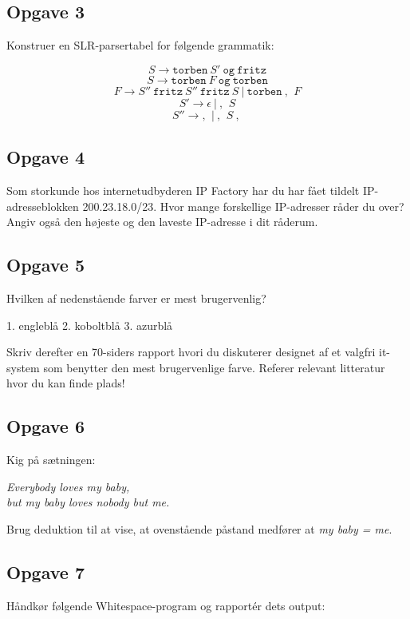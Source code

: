 \subsection{Opgave 3}
Konstruer en SLR-parsertabel for følgende grammatik:

\[
S \rightarrow \texttt{torben}\ S'\ \texttt{og}\ \texttt{fritz}
\]
\[
S \rightarrow \texttt{torben}\ F\ \texttt{og}\ \texttt{torben}
\]
\[
F \rightarrow S''\ \texttt{fritz}\ S''\ \texttt{fritz}\ S\ |\ \texttt{torben}\ \texttt{, }\ F
\]
\[
S' \rightarrow \epsilon\ |\ \texttt{, }\ S
\]
\[
S'' \rightarrow \texttt{, }\ |\ \texttt{, }\ S\ \texttt{, }
\]
\subsection{Opgave 4}
Som storkunde hos internetudbyderen IP Factory har du har fået tildelt IP-adresseblokken 200.23.18.0/23.
Hvor mange forskellige IP-adresser råder du over? Angiv også den højeste og den laveste IP-adresse i dit råderum.

\subsection{Opgave 5}
Hvilken af nedenstående farver er mest brugervenlig?
\begin{center}
\hspace*{.5cm} 1. engleblå \hspace*{.5cm} 2. koboltblå \hspace*{.5cm} 3. azurblå\hspace*{.5cm}
\end{center}
Skriv derefter en 70-siders rapport hvori du diskuterer designet af et valgfri
it-system som benytter den mest brugervenlige farve.
Referer relevant litteratur hvor du kan finde plads!

\subsection{Opgave 6}
Kig på sætningen:

\begin{center}
\emph{Everybody loves my baby,\\ but my baby loves nobody but me.}
\end{center}

Brug deduktion til at vise, at ovenstående påstand medfører at
\textit{my baby = me}.

\subsection{Opgave 7}
Håndkør følgende Whitespace-program og rapportér dets output:
\begin{verbatim}
   					   
	
     		 		  
	
     	 	 
	
  



\end{verbatim}

